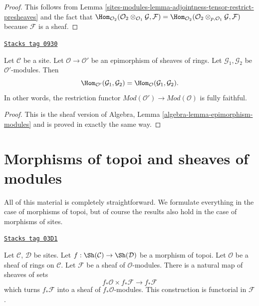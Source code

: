 \begin{proof}
This follows from
Lemma \ref{sites-modules-lemma-adjointness-tensor-restrict-presheaves}
and the fact that
$\Hom_{\mathcal{O}_2}(
\mathcal{O}_2 \otimes_{\mathcal{O}_1} \mathcal{G},
\mathcal{F}
)
=
\Hom_{\mathcal{O}_2}(
\mathcal{O}_2 \otimes_{p, \mathcal{O}_1} \mathcal{G},
\mathcal{F}
)$
because $\mathcal{F}$ is a sheaf.
\end{proof}

\begin{lemma}
\label{sites-modules-lemma-epimorphism-modules}
\href{https://stacks.math.columbia.edu/tag/0930}{\texttt{Stacks tag 0930}}

Let $\mathcal{C}$ be a site.
Let $\mathcal{O} \to \mathcal{O}'$ be an epimorphism of sheaves of rings.
Let $\mathcal{G}_1, \mathcal{G}_2$ be $\mathcal{O}'$-modules.
Then
$$
\Hom_{\mathcal{O}'}(\mathcal{G}_1, \mathcal{G}_2) =
\Hom_\mathcal{O}(\mathcal{G}_1, \mathcal{G}_2).
$$
In other words, the restriction functor
$\textit{Mod}(\mathcal{O}') \to \textit{Mod}(\mathcal{O})$ is fully faithful.
\end{lemma}

\begin{proof}
This is the sheaf version of
Algebra, Lemma \ref{algebra-lemma-epimorphism-modules}
and is proved in exactly the same way.
\end{proof}

\section{Morphisms of topoi and sheaves of modules}
\label{sites-modules-section-sheaves-modules-functorial}
All of this material is completely straightforward.
We formulate everything in the case of morphisms of topoi,
but of course the results also hold in the case of morphisms of sites.

\begin{lemma}
\label{sites-modules-lemma-pushforward-module}
\href{https://stacks.math.columbia.edu/tag/03D1}{\texttt{Stacks tag 03D1}}

Let $\mathcal{C}$, $\mathcal{D}$ be sites.
Let $f : \Sh(\mathcal{C}) \to \Sh(\mathcal{D})$
be a morphism of topoi.
Let $\mathcal{O}$ be a sheaf of rings on $\mathcal{C}$.
Let $\mathcal{F}$ be a sheaf of $\mathcal{O}$-modules.
There is a natural map of sheaves of sets
$$
f_*\mathcal{O} \times f_*\mathcal{F}
\longrightarrow
f_*\mathcal{F}
$$
which turns $f_*\mathcal{F}$ into a sheaf of $f_*\mathcal{O}$-modules.
This construction is functorial in $\mathcal{F}$.
\end{lemma}

